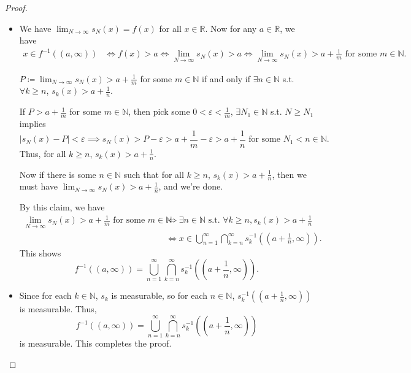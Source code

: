 \begin{proof}
    \hfill 
    \begin{itemize}
        \item [(a)] We have \(\lim_{N \to \infty} s_N(x) = f(x) \) for all \(x \in \mathbb{R}\). Now for any \(a \in \mathbb{R}\), we have 
        \begin{align*}
            x \in f^{-1}((a, \infty)) &\iff f(x) > a \iff \lim_{N \to \infty} s_N(x) > a \iff \lim_{N \to \infty} s_N(x) > a + \frac{1}{m} \text{ for some } m \in \mathbb{N}. 
        \end{align*}
        \begin{claim}
            \(P\coloneqq \lim_{N \to \infty} s_N(x) > a + \frac{1}{m} \) for some \(m \in \mathbb{N}\) if and only if \(\exists n \in \mathbb{N}\) s.t. \(\forall k \ge n\), \(s_k(x) > a + \frac{1}{n}\).     
        \end{claim}
        \begin{explanation}
            If \(P > a + \frac{1}{m}\) for some \(m \in \mathbb{N}\), then pick some \(0 < \varepsilon < \frac{1}{m}\), \(\exists N_1 \in \mathbb{N}\) s.t. \(N \ge N_1\) implies 
            \[
                \left\vert s_N(x) - P \right\vert < \varepsilon \implies s_N(x) > P - \varepsilon > a + \frac{1}{m} - \varepsilon > a + \frac{1}{n} \text{ for some } N_1 < n \in \mathbb{N}. 
            \]    
            Thus, for all \(k \ge n\), \(s_k(x) > a + \frac{1}{n}\).

            Now if there is some \(n \in \mathbb{N}\) such that for all \(k \ge n\), \(s_k(x) > a + \frac{1}{n}\), then we must have \(\lim_{N \to \infty} s_N(x) > a + \frac{1}{n} \), and we're done.  
        \end{explanation}
        By this claim, we have
        \begin{align*}
            \lim_{N \to \infty} s_N(x) > a + \frac{1}{m} \text{ for some } m \in \mathbb{N} &\iff \exists n \in \mathbb{N} \text{ s.t. } \forall k \ge n, s_k(x) > a + \frac{1}{n} \\
            &\iff x \in \bigcup_{n=1}^{\infty} \bigcap_{k=n}^{\infty} s_k^{-1} \left( \left( a + \frac{1}{n}, \infty  \right)  \right).       
        \end{align*}
        This shows 
        \[
            f^{-1} ((a, \infty)) = \bigcup_{n=1}^{\infty} \bigcap_{k=n}^{\infty} s_k^{-1} \left( \left( a + \frac{1}{n}, \infty  \right)  \right).
        \]
        \item [(b)] Since for each \(k \in \mathbb{N}\), \(s_k\) is measurable, so for each \(n \in \mathbb{N}\), \(s_k^{-1} \left( \left( a + \frac{1}{n}, \infty  \right)  \right) \) is measurable. Thus,
        \[
            f^{-1} ((a, \infty)) = \bigcup_{n=1}^{\infty} \bigcap_{k=n}^{\infty} s_k^{-1} \left( \left( a + \frac{1}{n}, \infty  \right)  \right)
        \]
        is measurable. This completes the proof.
    \end{itemize}
\end{proof}